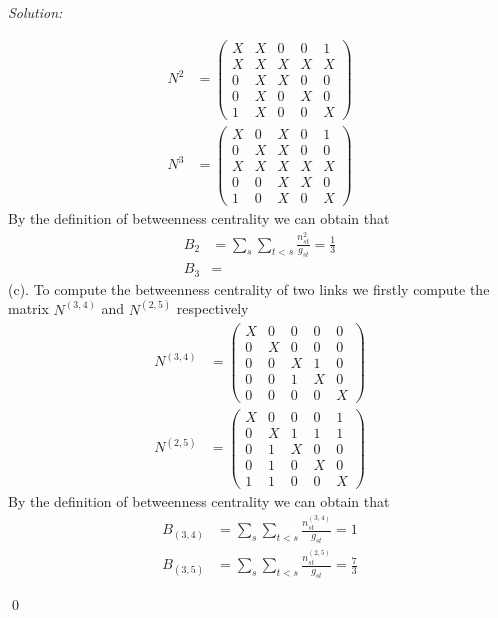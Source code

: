 \documentclass[12pt]{article}
\newenvironment{sol}
    {\emph{Solution:}
    }
    {
    \qed
    }
\begin{document}
\begin{sol}
\begin{align*}
			N^2 &= \begin{pmatrix}X & X & 0 & 0 & 1 \\ X & X & X & X & X \\ 0 & X & X & 0 & 0 \\ 0 & X & 0 & X & 0 \\ 1 & X & 0 & 0 & X\end{pmatrix} \\
			N^3 &= \begin{pmatrix}X & 0 & X & 0 & 1 \\ 0 & X & X & 0 & 0 \\ X & X & X & X & X \\ 0 & 0 & X & X & 0 \\ 1 & 0 & X & 0 & X\end{pmatrix}
		\end{align*}
		By the definition of betweenness centrality we can obtain that
		\begin{align*}
			B_2 &= \sum_s\sum_{t<s}\frac{n^2_{st}}{g_{st}} = \frac{1}{3} \\
			B_3 &= 
		\end{align*}
		(c). To compute the betweenness centrality of two links we firstly compute the matrix $N^{(3, 4)}$ and $N^{(2, 5)}$ respectively
		\begin{align*}
			N^{(3, 4)} &= \begin{pmatrix}X & 0 & 0 & 0 & 0 \\ 0 & X & 0 & 0 & 0 \\ 0 & 0 & X & 1 & 0 \\ 0 & 0 & 1 & X & 0 \\ 0 & 0 & 0 & 0 & X\end{pmatrix} \\
			N^{(2, 5)} &= \begin{pmatrix} X & 0 & 0 & 0 & 1 \\ 0 & X & 1 & 1 & 1 \\ 0 & 1 & X & 0 & 0 \\ 0 & 1 & 0 & X & 0 \\ 1 & 1 & 0 & 0 & X \end{pmatrix}
		\end{align*}
		By the definition of betweenness centrality we can obtain that
		\begin{align*}
			B_{(3,4)} &= \sum_s\sum_{t<s}\frac{n_{st}^{(3,4)}}{g_{st}} = 1 \\
			B_{(3,5)} &= \sum_s\sum_{t<s}\frac{n_{st}^{(2,5)}}{g_{st}} = \frac{7}{3}
		\end{align*}
	\end{sol}
\end{document}
